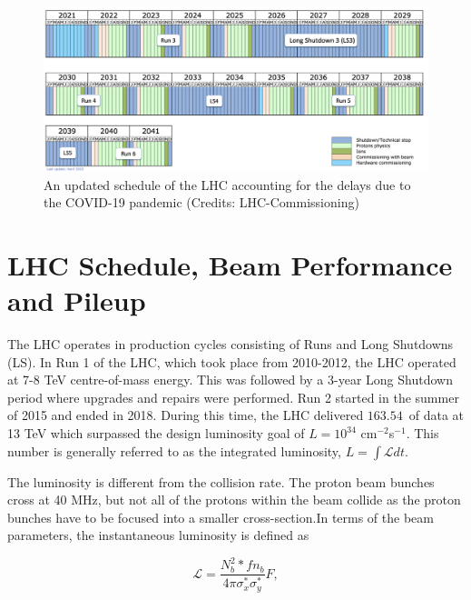 \begin{figure}[!htb]
	\centering
	\includegraphics[scale=0.3]{fig/HL-LHC.png}
	\caption{An updated schedule of the LHC accounting for the delays due to the COVID-19 pandemic (Credits: LHC-Commissioning)}
	\label{fig:lhcschedule}
\end{figure}

\section{LHC Schedule, Beam Performance and Pileup}

The LHC operates in production cycles consisting of Runs and Long Shutdowns (LS). In Run 1 of the LHC, which took place from 2010-2012, the LHC operated at 7-8 TeV centre-of-mass energy. This was followed by a 3-year Long Shutdown period where upgrades and repairs were performed. Run 2 started in the summer of 2015 and ended in 2018. During this time, the LHC delivered $163.54$~\fbinv  of data at 13 TeV which surpassed the design luminosity goal of $L = 10^{34}$ cm$^{-2}$s$^{-1}$. This number is generally referred to as the integrated luminosity, $L = \int \mathcal{L} dt$.

The luminosity is different from the collision rate. The proton beam bunches cross at 40 MHz, but not all of the protons within the beam collide as the proton bunches have to be focused into a smaller cross-section.In terms of the beam parameters, the instantaneous luminosity is defined as 

\begin{equation} \label{eq:beamParam}
    \mathcal{L} = \frac{N^2_{b}*fn_{b}}{4\pi\sigma^{*}_{x}\sigma^{*}_{y}}F,
\end{equation}

